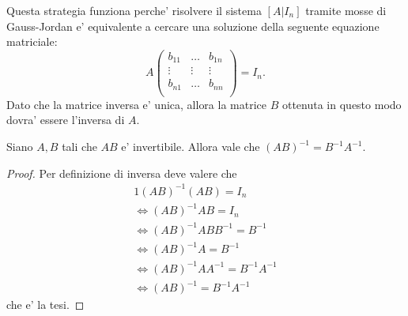 Questa strategia funziona perche' risolvere il sistema $[A | I_n]$ tramite mosse di Gauss-Jordan e' equivalente a cercare una soluzione della seguente equazione matriciale: \[
    A\begin{pmatrix}
        b_{11} & \dots & b_{1n} \\
        \vdots & \vdots & \vdots \\
        b_{n1} & \dots & b_{nn} \\
    \end{pmatrix} = I_n.
\] Dato che la matrice inversa e' unica, allora la matrice $B$ ottenuta in questo modo dovra' essere l'inversa di $A$.

\begin{proposition}
    \label{inversa_prodotto}
    Siano $A, B$ tali che $AB$ e' invertibile. Allora vale che $(AB)^{-1} = B^{-1}A^{-1}$.
\end{proposition}
\begin{proof}
    Per definizione di inversa deve valere che \begin{alignat*}
        {1}
        (AB)^{-1}(AB) = I_n \\
        \iff (AB)^{-1}AB = I_n \\
        \iff (AB)^{-1}ABB^{-1} = B^{-1}\\
        \iff (AB)^{-1}A = B^{-1}\\
        \iff (AB)^{-1}AA^{-1} = B^{-1}A^{-1}\\
        \iff (AB)^{-1} = B^{-1}A^{-1}
    \end{alignat*} 
    che e' la tesi.
\end{proof}

